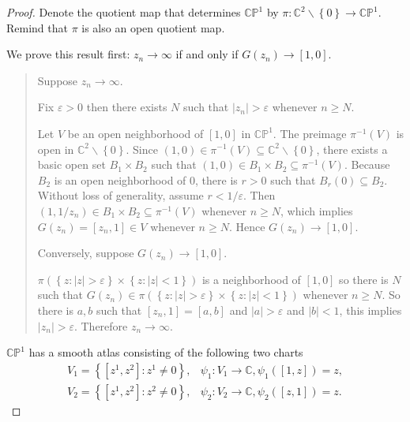 \begin{proof}
    Denote the quotient map that determines \( \mathbb{CP}^{1} \) by \( \pi: \mathbb{C}^{2} \smallsetminus \left\{ 0 \right\} \to \mathbb{CP}^{1} \). Remind that \( \pi \) is also an open quotient map.

    We prove this result first: \( z_{n} \to \infty \) if and only if \( G(z_{n}) \to [1, 0] \).

    \begin{quotation}
        Suppose \( z_{n} \to \infty \).

        Fix \( \varepsilon > 0 \) then there exists \( N \) such that \( \left\vert z_{n} \right\vert > \varepsilon \) whenever \( n \ge N \).

        Let \( V \) be an open neighborhood of \( [1, 0] \) in \( \mathbb{CP}^{1} \). The preimage \( \pi^{-1}(V) \) is open in \( \mathbb{C}^{2} \smallsetminus \left\{ 0 \right\} \). Since \( (1, 0) \in \pi^{-1}(V) \subseteq \mathbb{C}^{2} \smallsetminus \left\{ 0 \right\} \), there exists a basic open set \( B_{1} \times B_{2} \) such that \( (1, 0) \in B_{1} \times B_{2} \subseteq \pi^{-1}(V) \). Because \( B_{2} \) is an open neighborhood of \( 0 \), there is \( r > 0 \) such that \( B_{r}(0) \subseteq B_{2} \). Without loss of generality, assume \( r < 1/\varepsilon \). Then \( (1, 1/z_{n}) \in B_{1} \times B_{2} \subseteq \pi^{-1}(V) \) whenever \( n \ge N \), which implies \( G(z_{n}) = [z_{n}, 1] \in V \) whenever \( n \ge N \). Hence \( G(z_{n}) \to [1, 0] \).

        Conversely, suppose \( G(z_{n}) \to [1, 0] \).

        \( \pi( \left\{ z : \left\vert z \right\vert > \varepsilon \right\} \times \left\{ z : \left\vert z \right\vert < 1 \right\} ) \) is a neighborhood of \( [1, 0] \) so there is \( N \) such that \( G(z_{n}) \in \pi( \left\{ z : \left\vert z \right\vert > \varepsilon \right\} \times \left\{ z : \left\vert z \right\vert < 1 \right\}) \) whenever \( n \ge N \). So there is \( a, b \) such that \( [z_{n}, 1] = [a, b] \) and \( \left\vert a \right\vert > \varepsilon \) and \( \left\vert b \right\vert < 1 \), this implies \( \left\vert z_{n} \right\vert > \varepsilon \). Therefore \( z_{n} \to \infty \).
    \end{quotation}

    \( \mathbb{CP}^{1} \) has a smooth atlas consisting of the following two charts
    \begingroup
    \allowdisplaybreaks%
    \begin{align*}
        V_{1} = \left\{ [z^{1}, z^{2}]: z^{1} \ne 0 \right\}, & \psi_{1}: V_{1} \to \mathbb{C}, \psi_{1}([1, z]) = z, \\
        V_{2} = \left\{ [z^{1}, z^{2}]: z^{2} \ne 0 \right\}, & \psi_{2}: V_{2} \to \mathbb{C}, \psi_{2}([z, 1]) = z.
    \end{align*}
    \endgroup


\end{proof}
